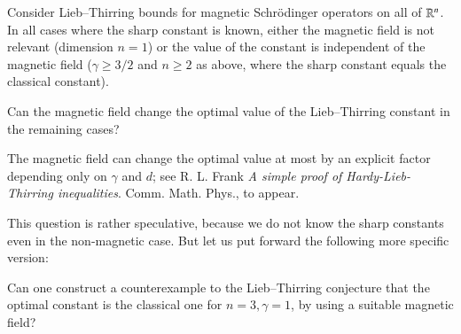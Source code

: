 \documentclass[12pt,letterpaper, reqno]{aimpl}
\begin{document}
\begin{problemblock}
 Consider Lieb--Thirring bounds for magnetic
Schr\"{o}dinger operators on all of $\mathbb R^n$. In all cases where the
sharp constant is known, either the magnetic field is not relevant
(dimension $n=1$) or the value of the constant is independent of the
magnetic field ($\gamma\geq 3/2$ and $n\geq 2$ as above, where the
sharp constant equals the classical constant).

\begin{problem}[2.6]
Can the magnetic field change the optimal value of the
Lieb--Thirring constant in the remaining cases?
\end{problem}

\begin{remark}
 The magnetic field can change the optimal
value at most by an explicit factor depending only on $\gamma$ and
$d$; see R. L. Frank \emph{A simple proof of Hardy-Lieb-Thirring
inequalities}. Comm. Math. Phys., to appear.
\end{remark}

\begin{remark}
This question is rather speculative, because we do not know the
sharp constants even in the non-magnetic case. But let us put
forward the following more specific version:
\end{remark}

\end{problemblock}

\begin{prob}[2.63]
Can one construct a counterexample to the Lieb--Thirring conjecture
that the optimal constant is the classical one for $n=3, \gamma=1$,
by using a suitable magnetic field?
\end{prob}
\end{document}
